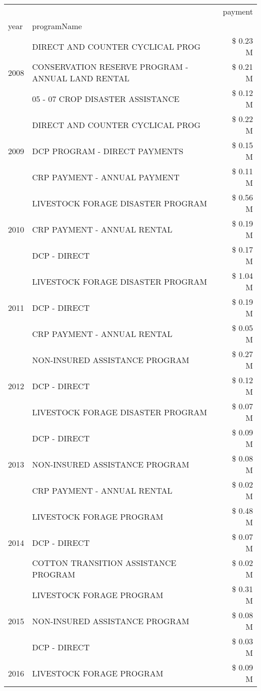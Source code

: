 \begin{tabular}{llr}
\toprule
 &  & payment \\
year & programName &  \\
\midrule
\multirow[t]{3}{*}{2008} & DIRECT AND COUNTER CYCLICAL PROG & \$ 0.23 M \\
 & CONSERVATION RESERVE PROGRAM - ANNUAL LAND RENTAL & \$ 0.21 M \\
 & 05 - 07 CROP DISASTER ASSISTANCE & \$ 0.12 M \\
\cline{1-3}
\multirow[t]{3}{*}{2009} & DIRECT AND COUNTER CYCLICAL PROG & \$ 0.22 M \\
 & DCP PROGRAM - DIRECT PAYMENTS & \$ 0.15 M \\
 & CRP PAYMENT - ANNUAL PAYMENT & \$ 0.11 M \\
\cline{1-3}
\multirow[t]{3}{*}{2010} & LIVESTOCK FORAGE DISASTER PROGRAM & \$ 0.56 M \\
 & CRP PAYMENT - ANNUAL RENTAL & \$ 0.19 M \\
 & DCP - DIRECT & \$ 0.17 M \\
\cline{1-3}
\multirow[t]{3}{*}{2011} & LIVESTOCK FORAGE DISASTER PROGRAM & \$ 1.04 M \\
 & DCP - DIRECT & \$ 0.19 M \\
 & CRP PAYMENT - ANNUAL RENTAL & \$ 0.05 M \\
\cline{1-3}
\multirow[t]{3}{*}{2012} & NON-INSURED ASSISTANCE PROGRAM & \$ 0.27 M \\
 & DCP - DIRECT & \$ 0.12 M \\
 & LIVESTOCK FORAGE DISASTER PROGRAM & \$ 0.07 M \\
\cline{1-3}
\multirow[t]{3}{*}{2013} & DCP - DIRECT & \$ 0.09 M \\
 & NON-INSURED ASSISTANCE PROGRAM & \$ 0.08 M \\
 & CRP PAYMENT - ANNUAL RENTAL & \$ 0.02 M \\
\cline{1-3}
\multirow[t]{3}{*}{2014} & LIVESTOCK FORAGE PROGRAM & \$ 0.48 M \\
 & DCP - DIRECT & \$ 0.07 M \\
 & COTTON TRANSITION ASSISTANCE PROGRAM & \$ 0.02 M \\
\cline{1-3}
\multirow[t]{3}{*}{2015} & LIVESTOCK FORAGE PROGRAM & \$ 0.31 M \\
 & NON-INSURED ASSISTANCE PROGRAM & \$ 0.08 M \\
 & DCP - DIRECT & \$ 0.03 M \\
\cline{1-3}
\multirow[t]{3}{*}{2016} & LIVESTOCK FORAGE PROGRAM & \$ 0.09 M \\

\end{tabular}
